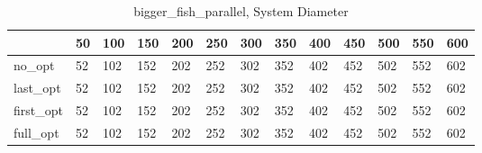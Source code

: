 \begin{table}
\caption{bigger\_fish\_parallel, System Diameter}
\label{bigger_fish_parallel_diam}
\begin{tabular}{lllllllllllll}
\toprule
 & 50 & 100 & 150 & 200 & 250 & 300 & 350 & 400 & 450 & 500 & 550 & 600 \\
\midrule
no\_opt & 52 & 102 & 152 & 202 & 252 & 302 & 352 & 402 & 452 & 502 & 552 & 602 \\
last\_opt & 52 & 102 & 152 & 202 & 252 & 302 & 352 & 402 & 452 & 502 & 552 & 602 \\
first\_opt & 52 & 102 & 152 & 202 & 252 & 302 & 352 & 402 & 452 & 502 & 552 & 602 \\
full\_opt & 52 & 102 & 152 & 202 & 252 & 302 & 352 & 402 & 452 & 502 & 552 & 602 \\
\bottomrule
\end{tabular}
\end{table}
